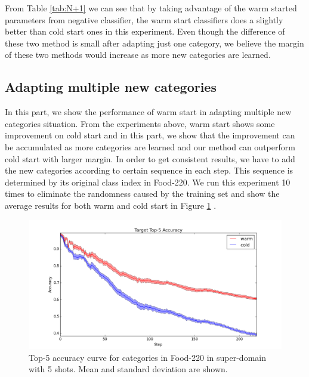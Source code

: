 From Table \ref{tab:N+1} we can see that by taking advantage of the warm started parameters from negative classifier, the warm start classifiers does a slightly better than cold start ones in this experiment. Even though the difference of these two method is small after adapting just one category, we believe the margin of these two methods would increase as more new categories are learned.
\subsection{Adapting multiple new categories}
In this part, we show the performance of warm start in adapting multiple new categories situation. From the experiments above, warm start shows some improvement on cold start and in this part, we show that the improvement can be accumulated as more categories are learned and our method can outperform cold start with larger margin. In order to get consistent results, we have to add the new categories according to certain sequence in each step.
This sequence is determined by its original class index in Food-220. We run this experiment 10 times to eliminate the randomness caused by the training set and show the average results for both warm and cold start in Figure \ref{fig:wama} .

\begin{figure}
  \centering
    \includegraphics[scale=0.4]{fig/M+N.png}
    \caption{Top-5 accuracy curve for categories in Food-220 in super-domain with 5 shots. Mean and standard deviation are shown.}
      \label{fig:wama}
\end{figure}

